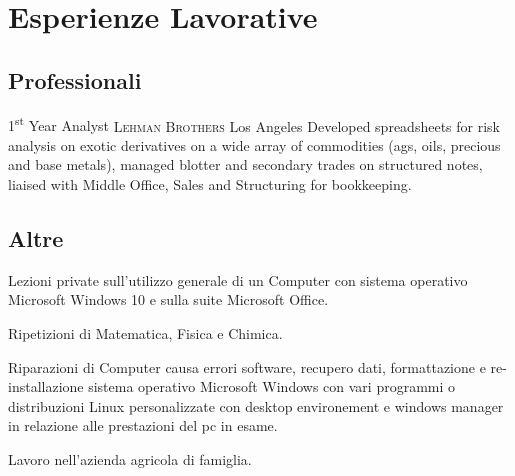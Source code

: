 %
%
%
%
%
%



\section{Esperienze Lavorative}

\subsection{Professionali}

{1\textsuperscript{st} Year Analyst}
{\textsc{Lehman Brothers}}
{Los Angeles}
{}
{Developed spreadsheets for risk analysis on exotic derivatives on a wide array
of commodities (ags, oils, precious and base metals), managed blotter and
secondary trades on structured notes, liaised with Middle Office, Sales and
Structuring for bookkeeping.}



\subsection{Altre}

{Lezioni private sull'utilizzo generale di un Computer con sistema operativo
Microsoft Windows 10 e sulla suite Microsoft Office.}

{Ripetizioni di Matematica, Fisica e Chimica.}

{Riparazioni di Computer causa errori software, recupero dati, formattazione e
re-installazione sistema operativo Microsoft Windows con vari programmi o
distribuzioni Linux personalizzate con desktop environement e windows manager in
relazione alle prestazioni del pc in esame.}

{Lavoro nell'azienda agricola di famiglia.}
